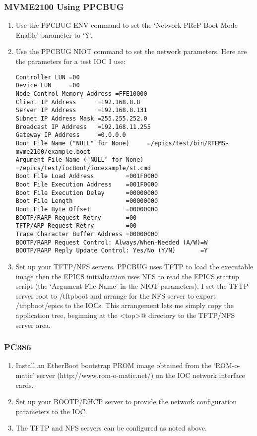 \documentclass{report}
\begin{document}
\subsubsection{MVME2100 Using PPCBUG}
\begin{enumerate}
\item Use the PPCBUG ENV command to set the `Network PReP-Boot Mode Enable'
parameter to `Y'.
\item Use the PPCBUG NIOT command to set the network parameters.  Here are the
parameters for a test IOC I use:
\begin{verbatim}
Controller LUN =00
Device LUN     =00
Node Control Memory Address =FFE10000
Client IP Address      =192.168.8.8
Server IP Address      =192.168.8.131
Subnet IP Address Mask =255.255.252.0
Broadcast IP Address   =192.168.11.255
Gateway IP Address     =0.0.0.0
Boot File Name ("NULL" for None)     =/epics/test/bin/RTEMS-mvme2100/example.boot
Argument File Name ("NULL" for None) =/epics/test/iocBoot/iocexample/st.cmd
Boot File Load Address         =001F0000
Boot File Execution Address    =001F0000
Boot File Execution Delay      =00000000
Boot File Length               =00000000
Boot File Byte Offset          =00000000
BOOTP/RARP Request Retry       =00
TFTP/ARP Request Retry         =00
Trace Character Buffer Address =00000000
BOOTP/RARP Request Control: Always/When-Needed (A/W)=W
BOOTP/RARP Reply Update Control: Yes/No (Y/N)       =Y
\end{verbatim}
\item Set up your TFTP/NFS servers.  PPCBUG uses TFTP
to load the executable image then the EPICS initialization uses
NFS to read the EPICS startup script (the `Argument File Name' in the NIOT
parameters).
I set the TFTP server root to /tftpboot and arrange for the NFS server to
export /tftpboot/epics to the IOCs.  This arrangement lets me simply copy the
application tree, beginning at the \verb@<top>@ directory to the TFTP/NFS server area.
\end{enumerate}

\subsubsection{PC386}
\begin{enumerate}
\item Install an EtherBoot bootstrap PROM image obtained from
the `ROM-o-matic' server (http://www.rom-o-matic.net/) on the IOC
network interface cards.
\item Set up your BOOTP/DHCP server to provide the network configuration
parameters to the IOC.
\item The TFTP and NFS servers can be configured as noted above.
\end{enumerate}
\end{document}
